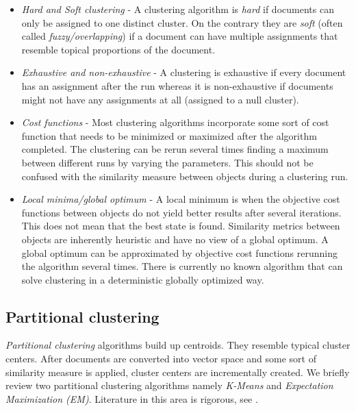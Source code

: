   \begin{itemize}
    \item \emph{Hard and Soft clustering} - A clustering algorithm is \emph{hard} if documents can only be assigned to one distinct cluster. On the contrary they are \emph{soft} (often called \emph{fuzzy/overlapping}) if a document can have multiple assignments that resemble topical proportions of the document.
    \item \emph{Exhaustive and non-exhaustive} - A clustering is exhaustive if every document has an assignment after the run whereas it is non-exhaustive if documents might not have any assignments at all (assigned to a null cluster).
    \item \emph{Cost functions} - Most clustering algorithms incorporate some sort of cost function that needs to be minimized or maximized after the algorithm completed. The clustering can be rerun several times finding a maximum between different runs by varying the parameters. This should not be confused with the similarity measure between objects during a clustering run.
    \item \emph{Local minima/global optimum} - A local minimum is when the objective cost functions between objects do not yield better results after several iterations. This does not mean that the best state is found. Similarity metrics between objects are inherently heuristic and have no view of a global optimum. A global optimum can be approximated by objective cost functions rerunning the algorithm several times. There is currently no known algorithm that can solve clustering in a deterministic globally optimized way.
  \end{itemize}

  \subsection{Partitional clustering}
    \emph{Partitional clustering} algorithms build up centroids. They resemble typical cluster centers. After documents are converted into vector space and some sort of similarity measure is applied, cluster centers are incrementally created. We briefly review two partitional clustering algorithms namely \emph{K-Means} and \emph{Expectation Maximization (EM)}. Literature in this area is rigorous, see \cite{ClusteringBooAggarwalk2013, NextFrontierClustering2013, IRBookStanford2008}.

